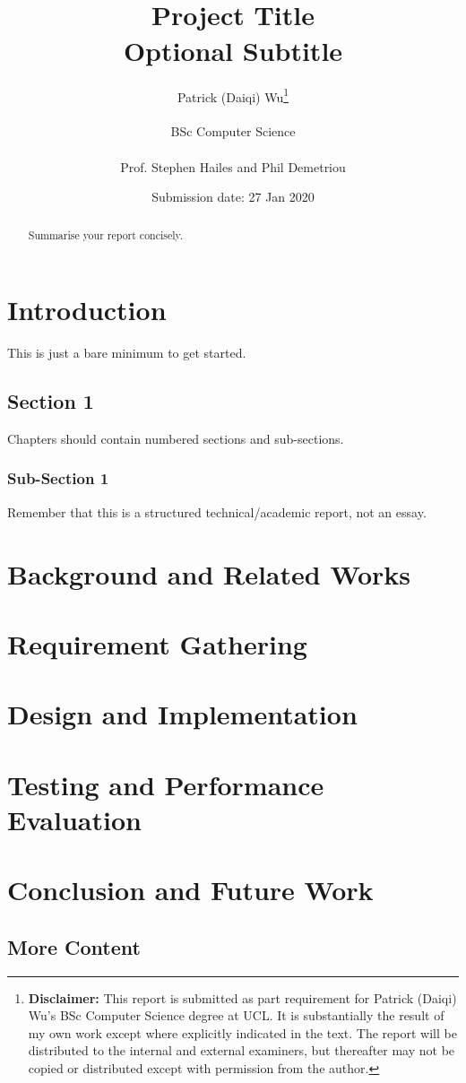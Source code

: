 \documentclass[a4paper]{report}
\title{{\vspace{-14em}}\\
{{\Huge Project Title}}\\
{\large Optional Subtitle}\\}
\date{Submission date: 27 Jan 2020}
\author{Patrick (Daiqi) Wu\thanks{
{\bf Disclaimer:}
This report is submitted as part requirement for Patrick (Daiqi) Wu's BSc Computer Science degree at UCL. It is
substantially the result of my own work except where explicitly indicated in the text.
The report will be distributed to the internal and external examiners, but thereafter may not be copied or distributed except with permission from the author.}
\\ \\
BSc Computer Science\\ \\
Prof. Stephen Hailes and Phil Demetriou}
\begin{document}
 
\onehalfspacing
\maketitle
\begin{abstract}
Summarise your report concisely.
\end{abstract}
\tableofcontents
\setcounter{page}{1}


\chapter{Introduction}
This is just a bare minimum to get started.

\section{Section 1}
Chapters should contain numbered sections and sub-sections.

\subsection{Sub-Section 1}
Remember that this is a structured technical/academic report, not an essay.

\chapter{Background and Related Works}

\chapter{Requirement Gathering}

\chapter{Design and Implementation}

\chapter{Testing and Performance Evaluation}

\chapter{Conclusion and Future Work}

\section{More Content}
\end{document}
